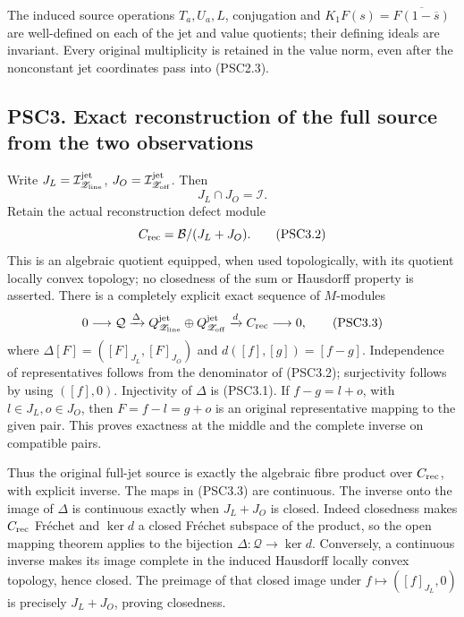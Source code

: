 The induced source operations \(T_a,U_a,L\), conjugation and
\(K_1F(s)=\overline{F(1-\overline s)}\) are well-defined on each of the
jet and value quotients; their defining ideals are invariant. Every
original multiplicity is retained in the value norm, even after the
nonconstant jet coordinates pass into (PSC2.3).

\subsection{PSC3. Exact reconstruction of the full source from the two
observations}\label{psc3.-exact-reconstruction-of-the-full-source-from-the-two-observations}

Write \(J_L=\mathcal I_{\mathscr Z_{\rm line}}^{\rm jet}\),
\(J_O=\mathcal I_{\mathscr Z_{\rm off}}^{\rm jet}\). Then \[
J_L\cap J_O=\mathcal I.
\tag{PSC3.1}
\] Retain the actual reconstruction defect module \[
C_{\rm rec}=\mathcal B/(J_L+J_O).
\tag{PSC3.2}
\] This is an algebraic quotient equipped, when used topologically, with
its quotient locally convex topology; no closedness of the sum or
Hausdorff property is asserted. There is a completely explicit exact
sequence of \(M\)-modules \[
0\longrightarrow\mathcal Q
\xrightarrow{\Delta}Q_{\mathscr Z_{\rm line}}^{\rm jet}\oplus Q_{\mathscr Z_{\rm off}}^{\rm jet}
\xrightarrow{d}C_{\rm rec}\longrightarrow0,
\tag{PSC3.3}
\] where \(\Delta[F]=([F]_{J_L},[F]_{J_O})\) and \(d([f],[g])=[f-g]\).
Independence of representatives follows from the denominator of
(PSC3.2); surjectivity follows by using \(([f],0)\). Injectivity of
\(\Delta\) is (PSC3.1). If \(f-g=l+o\), with \(l\in J_L,o\in J_O\), then
\(F=f-l=g+o\) is an original representative mapping to the given pair.
This proves exactness at the middle and the complete inverse on
compatible pairs.

Thus the original full-jet source is exactly the algebraic fibre product
over \(C_{\rm rec}\), with explicit inverse. The maps in (PSC3.3) are
continuous. The inverse onto the image of \(\Delta\) is continuous
exactly when \(J_L+J_O\) is closed. Indeed closedness makes
\(C_{\rm rec}\) Fréchet and \(\ker d\) a closed Fréchet subspace of the
product, so the open mapping theorem applies to the bijection
\(\Delta:\mathcal Q\to\ker d\). Conversely, a continuous inverse makes
its image complete in the induced Hausdorff locally convex topology,
hence closed. The preimage of that closed image under
\(f\mapsto([f]_{J_L},0)\) is precisely \(J_L+J_O\), proving closedness.

